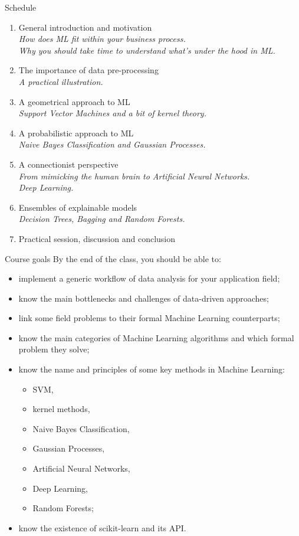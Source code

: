 \documentclass{beamer}
\begin{document}
\begin{frame}{Schedule}
\begin{enumerate}
\item General introduction and motivation \Checkmark \\
{\small \it How does ML fit within your business process.\\
Why you should take time to understand what's under the hood in ML.}
\item The importance of data pre-processing \Checkmark \\
{\small \it A practical illustration.}
\item A geometrical approach to ML \Checkmark \\
{\small \it Support Vector Machines and a bit of kernel theory.}
\item A probabilistic approach to ML \Checkmark \\
{\small \it Naive Bayes Classification and Gaussian Processes.}
\item A connectionist perspective \Checkmark \\
{\small \it From mimicking the human brain to Artificial Neural Networks.\\
Deep Learning.}
\item Ensembles of explainable models \Checkmark \\
{\small \it Decision Trees, Bagging and Random Forests.}
\item Practical session, discussion and conclusion \Checkmark
\end{enumerate}
\end{frame}

\begin{frame}{Course goals}
\small
By the end of the class, you should be able to:
\begin{itemize}
\item implement a generic workflow of data analysis for your application field;
\item know the main bottlenecks and challenges of data-driven approaches;
\item link some field problems to their formal Machine Learning counterparts;
\item know the main categories of Machine Learning algorithms and which formal problem they solve;
\item know the name and principles of some key methods in Machine Learning:
\begin{itemize}
\item SVM,
\item kernel methods,
\item Naive Bayes Classification,
\item Gaussian Processes,
\item Artificial Neural Networks,
\item Deep Learning,
\item Random Forests;
\end{itemize} 
\item know the existence of scikit-learn and its API.
\end{itemize}
\end{frame}
\end{document}
